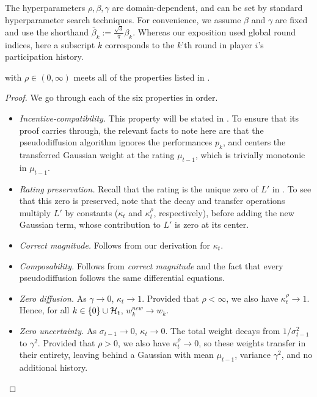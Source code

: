 The hyperparameters $\rho,\beta,\gamma$ are domain-dependent, and can be set by standard hyperparameter search techniques. For convenience, we assume $\beta$ and $\gamma$ are fixed and use the shorthand $\bar\beta_k := \frac{\sqrt{3}}{\pi} \beta_k$. Whereas our exposition used global round indices, here a subscript $k$ corresponds to the $k$'th round in player $i$'s participation history.

\begin{theorem}
\label{thm:diffuse-prop}
 with $\rho\in(0,\infty)$ meets all of the properties listed in .
\end{theorem}

\begin{proof}
We go through each of the six properties in order.
\begin{itemize}[leftmargin=*]
    \item \emph{Incentive-compatibility.} This property will be stated in . To ensure that its proof carries through, the relevant facts to note here are that the pseudodiffusion algorithm ignores the performances $p_k$, and centers the transferred Gaussian weight at the rating $\mu_{t-1}$, which is trivially monotonic in $\mu_{t-1}$.
    \item \emph{Rating preservation.} Recall that the rating is the unique zero of $L'$ in . To see that this zero is preserved, note that the decay and transfer operations multiply $L'$ by constants ($\kappa_t$ and $\kappa_t^\rho$, respectively), before adding the new Gaussian term, whose contribution to $L'$ is zero at its center.
    \item \emph{Correct magnitude.} Follows from our derivation for $\kappa_t$.
    \item \emph{Composability.} Follows from \emph{correct magnitude} and the fact that every pseudodiffusion follows the same differential equations.
    \item \emph{Zero diffusion.} As $\gamma\rightarrow 0$, $\kappa_t\rightarrow 1$. Provided that $\rho<\infty$, we also have $\kappa_t^\rho\rightarrow 1$. Hence, for all $k\in\{0\}\cup{\mathcal{H}}_t$, $w_k^{new} \rightarrow w_k$.
    \item \emph{Zero uncertainty.} As $\sigma_{t-1}\rightarrow 0$, $\kappa_t\rightarrow 0$. The total weight decays from $1/\sigma_{t-1}^2$ to $\gamma^2$. Provided that $\rho > 0$, we also have $\kappa_t^\rho\rightarrow 0$, so these weights transfer in their entirety, leaving behind a Gaussian with mean $\mu_{t-1}$, variance $\gamma^2$, and no additional history. \qedhere
\end{itemize}
\end{proof}

